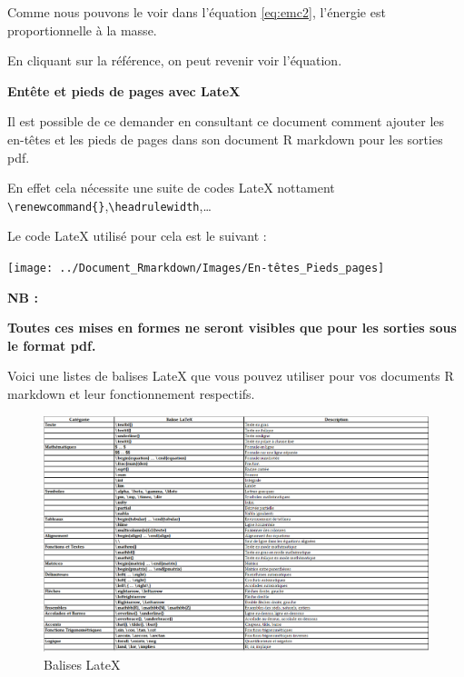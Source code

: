 \documentclass[
  12pt,
]{article}
\begin{document}
Comme nous pouvons le voir dans l'équation \eqref{eq:emc2}, l'énergie
est proportionnelle à la masse.

En cliquant sur la référence, on peut revenir voir l'équation.

\textbf{Entête et pieds de pages avec LateX}

Il est possible de ce demander en consultant ce document comment ajouter
les en-têtes et les pieds de pages dans son document R markdown pour les
sorties pdf.

En effet cela nécessite une suite de codes LateX nottament
\texttt{\textbackslash{}renewcommand\{\}},\texttt{\textbackslash{}headrulewidth},\ldots{}

Le code LateX utilisé pour cela est le suivant :

\begin{center}\texttt{[image: ../Document\_Rmarkdown/Images/En-têtes\_Pieds\_pages]} \end{center}

\textbf{NB :}

\textbf{Toutes ces mises en formes ne seront visibles que pour les
sorties sous le format pdf.}

Voici une listes de balises LateX que vous pouvez utiliser pour vos
documents R markdown et leur fonctionnement respectifs.

\begin{figure}

{\centering \includegraphics[width=1\linewidth,height=1\textheight]{../Document_Rmarkdown/Images/Balises_LateX} 

}

\caption{Balises LateX}\label{fig:unnamed-chunk-36}
\end{figure}
\end{document}
